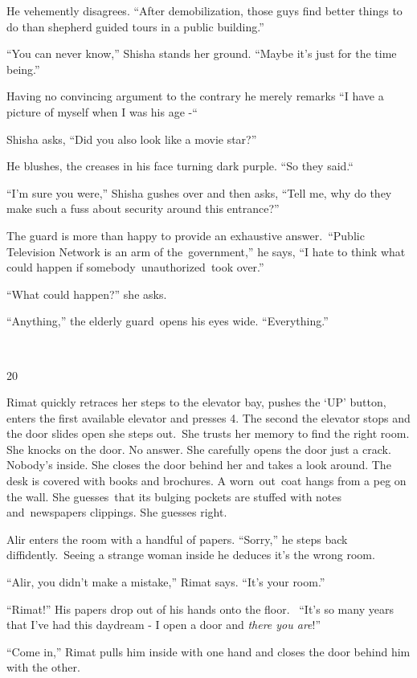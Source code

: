 \documentclass[twoside,11pt]{book}
\begin{document}
He vehemently disagrees. ``After demobilization, those guys find better things to do than shepherd guided
tours in a public building.'' 

``You can never know,'' Shisha stands her ground. ``Maybe it's just for the time
being.'' 

Having no convincing argument to the contrary he merely remarks ``I have a picture of myself when I was his
age -``\ \ 

Shisha asks, ``Did you also look like a movie star?'' 

He blushes, the creases in his face turning dark purple. ``So they said.``~ 

``I'm sure you were,'' Shisha gushes over and then asks, ``Tell me, why do they
make such a fuss about security around this entrance?'' 

The guard is more than happy to provide an exhaustive answer.\ ``Public Television Network is an arm of
the~government,'' he says, ``I hate to think what could happen if somebody~unauthorized~took
over.''

``What could happen?'' she asks.

``Anything,'' the elderly guard\ opens his eyes wide.
``Everything.''

~

20~

Rimat quickly retraces her steps to the elevator bay, pushes the `UP' button, enters the first available elevator and
presses 4. The second the elevator stops and the door slides open she steps out.\ She trusts her memory to find the
right room. She knocks on the door. No answer. She carefully opens the door just a crack. Nobody's inside. She closes
the door behind her and takes a look around. The desk is covered with books and brochures. A worn\ out\ coat hangs from
a peg on the wall. She guesses\ that its bulging pockets are stuffed with notes and{\ }newspapers
clippings. She guesses right.\ 

Alir enters the room with a handful of papers. ``Sorry,'' he steps back diffidently.\ Seeing a
strange woman inside he deduces it's the wrong room. 

``Alir, you didn't make a mistake,'' Rimat says. ``It's your room.''


``Rimat!'' His papers drop out of his hands onto the floor.~ ``It's so many years
that I've had this daydream - I open a door and \textit{there you are}!''

``Come in,'' Rimat pulls him inside with one hand and closes the door behind him with the
other.
\end{document}
